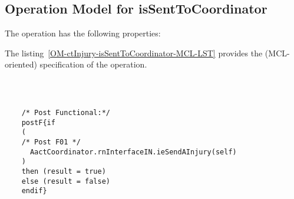 \subsection{Operation Model for isSentToCoordinator}

\label{OM-isSentToCoordinator}


The  operation has the following properties:

	\begin{operationmodel}



		


	\end{operationmodel}



	\vspace{1cm}
	The listing~\ref{OM-ctInjury-isSentToCoordinator-MCL-LST} provides the \msrmessir (MCL-oriented) specification of the operation.
	
	\scriptsize
	\vspace{0.5cm}
	\begin{lstlisting}[style=MessirStyle,firstnumber=auto,captionpos=b,caption={\msrmessir (MCL-oriented) specification of the operation \emph{isSentToCoordinator}.},label=OM-ctInjury-isSentToCoordinator-MCL-LST]

	
	
	/* Post Functional:*/ 
	postF{if 
	(
	/* Post F01 */
	  AactCoordinator.rnInterfaceIN.ieSendAInjury(self)
	)
	then (result = true)
	else (result = false)
	endif}
	
	
	\end{lstlisting}
	\normalsize 
	
	
	
	
	
